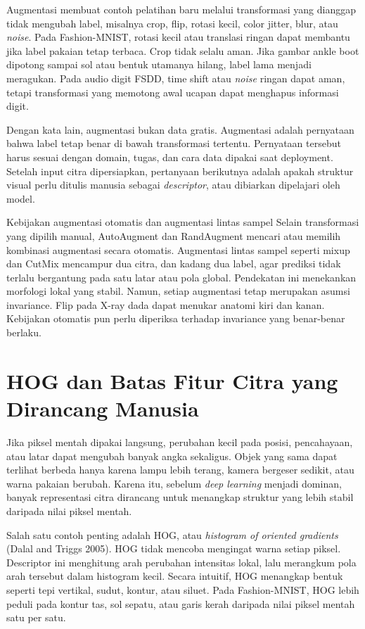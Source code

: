 Augmentasi membuat contoh pelatihan baru melalui transformasi yang dianggap tidak mengubah label, misalnya crop, flip, rotasi kecil, color jitter, blur, atau \emph{noise}. Pada Fashion-MNIST, rotasi kecil atau translasi ringan dapat membantu jika label pakaian tetap terbaca. Crop tidak selalu aman. Jika gambar ankle boot dipotong sampai sol atau bentuk utamanya hilang, label lama menjadi meragukan. Pada audio digit FSDD, time shift atau \emph{noise} ringan dapat aman, tetapi transformasi yang memotong awal ucapan dapat menghapus informasi digit.

Dengan kata lain, augmentasi bukan data gratis. Augmentasi adalah pernyataan bahwa label tetap benar di bawah transformasi tertentu. Pernyataan tersebut harus sesuai dengan domain, tugas, dan cara data dipakai saat deployment. Setelah input citra dipersiapkan, pertanyaan berikutnya adalah apakah struktur visual perlu ditulis manusia sebagai \emph{descriptor}, atau dibiarkan dipelajari oleh model.

\begin{pendalaman}{Kebijakan augmentasi otomatis dan augmentasi lintas sampel}
Selain transformasi yang dipilih manual, AutoAugment dan RandAugment mencari atau memilih kombinasi augmentasi secara otomatis. Augmentasi lintas sampel seperti mixup dan CutMix mencampur dua citra, dan kadang dua label, agar prediksi tidak terlalu bergantung pada satu latar atau pola global. Pendekatan ini menekankan morfologi lokal yang stabil. Namun, setiap augmentasi tetap merupakan asumsi invariance. Flip pada X-ray dada dapat menukar anatomi kiri dan kanan. Kebijakan otomatis pun perlu diperiksa terhadap invariance yang benar-benar berlaku.
\end{pendalaman}

\section{HOG dan Batas Fitur Citra yang Dirancang Manusia}\label{hog-dan-batas-fitur-citra-yang-dirancang-manusia}

Jika piksel mentah dipakai langsung, perubahan kecil pada posisi, pencahayaan, atau latar dapat mengubah banyak angka sekaligus. Objek yang sama dapat terlihat berbeda hanya karena lampu lebih terang, kamera bergeser sedikit, atau warna pakaian berubah. Karena itu, sebelum \emph{deep learning} menjadi dominan, banyak representasi citra dirancang untuk menangkap struktur yang lebih stabil daripada nilai piksel mentah.

Salah satu contoh penting adalah HOG, atau \emph{histogram of oriented gradients} (Dalal and Triggs 2005). HOG tidak mencoba mengingat warna setiap piksel. Descriptor ini menghitung arah perubahan intensitas lokal, lalu merangkum pola arah tersebut dalam histogram kecil. Secara intuitif, HOG menangkap bentuk seperti tepi vertikal, sudut, kontur, atau siluet. Pada Fashion-MNIST, HOG lebih peduli pada kontur tas, sol sepatu, atau garis kerah daripada nilai piksel mentah satu per satu.


